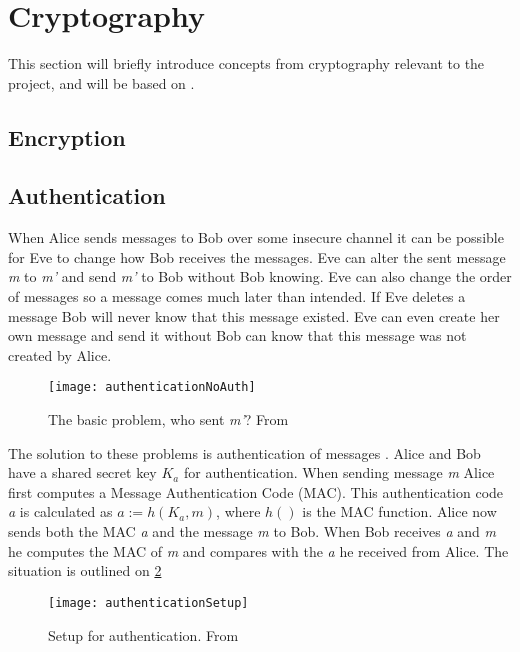 \section{Cryptography}
This section will briefly introduce concepts from cryptography relevant to the project, and will be based on \cite{cryptoenginering}.

\subsection{Encryption}

\subsection{Authentication}
When Alice sends messages to Bob over some insecure channel it can be possible for Eve to change how Bob receives the messages.
Eve can alter the sent message \emph{m} to \emph{m'} and send \emph{m'} to Bob without Bob knowing.
Eve can also change the order of messages so a message comes much later than intended.
If Eve deletes a message Bob will never know that this message existed.
Eve can even create her own message and send it without Bob can know that this message was not created by Alice.

\begin{figure}[H]
	\centering
	\texttt{[image: authenticationNoAuth]}
	\caption{The basic problem, who sent \emph{m'}? From \citet[p.~52]{cryptoenginering}}
	\label{crypto:noauth}
\end{figure}

The solution to these problems is authentication of messages \citet[p.~52]{cryptoenginering}.
Alice and Bob have a shared secret key $K_a$ for authentication.
When sending message \emph{m} Alice first computes a Message Authentication Code (MAC).
This authentication code \emph{a} is calculated as $a := h(K_a,m)$, where $h()$ is the MAC function.
Alice now sends both the MAC \emph{a} and the message \emph{m} to Bob.
When Bob receives \emph{a} and \emph{m} he computes the MAC of \emph{m} and compares with the \emph{a} he received from Alice.
The situation is outlined on \cref{crypto:authsetup}

\begin{figure}[H]
	\centering
	\texttt{[image: authenticationSetup]}
	\caption{Setup for authentication. From \citet[p.~53]{cryptoenginering}}
	\label{crypto:authsetup}
\end{figure}

